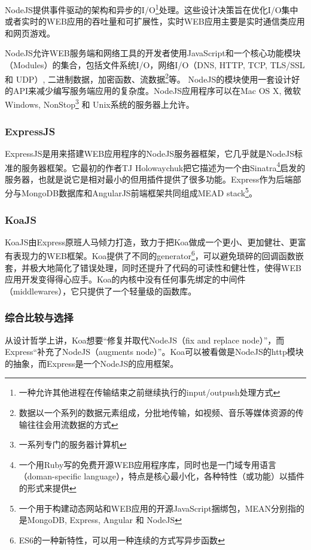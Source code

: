 NodeJS提供事件驱动的架构和异步的I/O\footnote{一种允许其他进程在传输结束之前继续执行的input/outpush处理方式}处理。这些设计决策旨在优化I/O集中或者实时的WEB应用的吞吐量和可扩展性，实时WEB应用主要是实时通信类应用和网页游戏。

NodeJS允许WEB服务端和网络工具的开发者使用JavaScript和一个核心功能模块（Modules）的集合，包括文件系统I/O，网络I/O（DNS, HTTP, TCP, TLS/SSL 和 UDP）, 二进制数据，加密函数、流数据\footnote{数据以一个系列的数据元素组成，分批地传输，如视频、音乐等媒体资源的传输往往会用流数据的方式}等\supercite{teixeira2012professional}。 NodeJS的模块使用一套设计好的API来减少编写服务端应用的复杂度。NodeJS应用程序可以在Mac OS X, 微软Windows, NonStop\footnote{一系列专门的服务器计算机} 和 Unix系统的服务器上允许。

\subsubsection{ExpressJS}
ExpressJS是用来搭建WEB应用程序的NodeJS服务器框架，它几乎就是NodeJS标准的服务器框架。它最初的作者TJ Holowaychuk把它描述为一个由Sinatra\footnote{一个用Ruby写的免费开源WEB应用程序库，同时也是一门域专用语言（doman-specific language），特点是核心最小化，各种特性（或功能）以插件的形式来提供}启发的服务器，也就是说它是相对最小的但用插件提供了很多功能。Express作为后端部分与MongoDB数据库和AngularJS前端框架共同组成MEAD stack\footnote{一个用于构建动态网站和WEB应用的开源JavaScript捆绑包，MEAN分别指的是MongoDB, Express, Angular 和 NodeJS}。

\subsubsection{KoaJS}
KoaJS由Express原班人马倾力打造，致力于把Koa做成一个更小、更加健壮、更富有表现力的WEB框架。Koa提供了不同的generator\footnote{ES6的一种新特性，可以用一种连续的方式写异步函数}，可以避免琐碎的回调函数嵌套，并极大地简化了错误处理，同时还提升了代码的可读性和健壮性，使得WEB应用开发变得得心应手。Koa的内核中没有任何事先绑定的中间件（middlewares），它只提供了一个轻量级的函数库。

\subsubsection{综合比较与选择}
从设计哲学上讲，Koa想要“修复并取代NodeJS（fix and replace node）”，而Express“补充了NodeJS（augments node）”。Koa可以被看做是NodeJS的http模块的抽象，而Express是一个NodeJS的应用框架。


